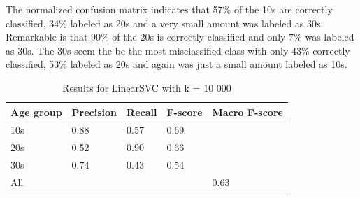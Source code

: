 \documentclass{clv3}
\begin{document}
The normalized confusion matrix indicates that 57\% of the 10s are correctly classified, 34\% labeled as 20s and a very small amount was labeled as 30s. Remarkable is that 90\% of the 20s is correctly classified and only 7\% was  labeled as 30s. The 30s seem the be the most misclassified class with only 43\% correctly classified, 53\% labeled as 20s and again was just a small amount labeled as 10s.

\begin{table}[h]
\centering
\caption{Results for LinearSVC with k = 10 000}
\label{table4}
\begin{tabular}{|l|l|l|l|l|}
\hline
Age group & Precision & Recall & F-score & Macro F-score \\ \hline
10s       & 0.88      & 0.57   & 0.69    &               \\ \hline
20s       & 0.52      & 0.90   & 0.66    &               \\ \hline
30s       & 0.74      & 0.43   & 0.54    &               \\ \hline
All       &           &        &         & 0.63          \\ \hline
\end{tabular}
\end{table}
\end{document}
